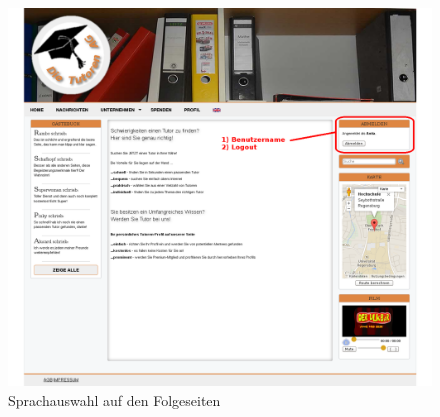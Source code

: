 \begin{figure}[!htbp]
 \centering
 \includegraphics[width=1\textwidth]{../Screenshots/de/logout}
 \caption{Sprachauswahl auf den Folgeseiten}
 \label{fig:logout}
\end{figure}